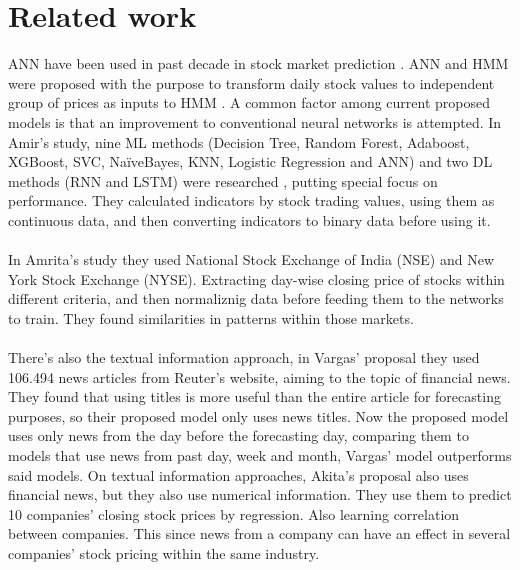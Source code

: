 \documentclass[conference]{IEEEtran}
\begin{document}
\section{Related work}
ANN have been used in past decade in stock market prediction \cite{M2018}. ANN and HMM were proposed with the purpose to transform daily
stock values to independent group of prices as inputs to HMM \cite{nabipour2020predicting}. A common factor among current proposed models is that
an improvement to conventional neural networks is attempted. In Amir's study, nine ML methods (Decision Tree, Random Forest, Adaboost, XGBoost, SVC, NaïveBayes, KNN, Logistic Regression and ANN)
and two DL methods  (RNN and LSTM) were researched \cite{nabipour2020predicting} , putting special focus on performance.
They calculated indicators by stock trading values, using them as continuous data, and then converting indicators to binary data before using it. 
\\\\
In Amrita's study they used National Stock Exchange of India (NSE) and New York Stock Exchange (NYSE). Extracting day-wise closing price of stocks within different criteria, and then normaliznig data before feeding them to the
networks to train. They found similarities in patterns within those markets.
\\\\
There's also the textual information approach, in Vargas' proposal \cite{Vargas2017} they used 106.494 news articles
from Reuter's website, aiming to the topic of financial news. They found that using titles is more useful than the entire article for forecasting purposes,
so their proposed model only uses news titles. Now the proposed model uses only news from the day before the forecasting day, comparing them to models that use news from past day, week and month,
Vargas' model outperforms said models. On textual information approaches, Akita's proposal \cite{Akita2016} also uses financial news, but they also use numerical information. They use them to predict 10 companies' closing stock prices by regression.
Also learning correlation between companies. This since news from a company can have an effect in several companies' stock pricing within the same industry. 
\end{document}
